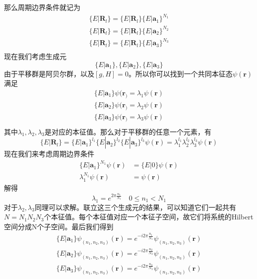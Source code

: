 那么周期边界条件就记为
\begin{equation}
\begin{aligned}
        \{E| \mathbf{R}_l\} = \{E| \mathbf{R}_l\}\{E| \mathbf{a}_1\}^{N_1}\\
        \{E| \mathbf{R}_l\} = \{E| \mathbf{R}_l\}\{E| \mathbf{a}_2\}^{N_2}\\
        \{E| \mathbf{R}_l\} = \{E| \mathbf{R}_l\}\{E| \mathbf{a}_3\}^{N_3}\\
\end{aligned}
\end{equation}
现在我们考虑生成元
\begin{equation}
    \{E|\mathbf{a}_1\},\{E|\mathbf{a}_2\},\{E|\mathbf{a}_3\}
\end{equation}
由于平移群是阿贝尔群，以及$[g,H]=0$。所以你可以找到一个共同本征态$\psi(\mathbf{r})$满足
\begin{equation}
\begin{aligned}
        \{E|\mathbf{a}_1\} \psi(\mathbf{r}_) = \lambda_1 \psi(\mathbf{r}) \\
     \{E|\mathbf{a}_2\} \psi(\mathbf{r}_) = \lambda_2 \psi(\mathbf{r}) \\
      \{E|\mathbf{a}_3\} \psi(\mathbf{r}_) = \lambda_3 \psi(\mathbf{r}) \\
\end{aligned}
\end{equation}
其中$\lambda_1,\lambda_2,\lambda_3$是对应的本征值。那么对于平移群的任意一个元素，有
\begin{equation}
     \{E| \mathbf{R}_l\} = \{E|\mathbf{a}_1\}^{l_1}\{E|\mathbf{a}_2\}^{l_2}\{E|\mathbf{a}_3\}^{l_3} \psi(\mathbf{r}) = \lambda_1^{l_1}\lambda_2^{l_2}\lambda_3^{l_3}\psi(\mathbf{r})
\end{equation}
现在我们来考虑周期边界条件
\begin{equation}
\begin{aligned}
    \{E|\mathbf{a}_1\}^{N_1}\psi(\mathbf{r}) &= \{E|0\}\psi(\mathbf{r})\\
    \lambda_1^{N_1} \psi(\mathbf{r}) &= \psi(\mathbf{r})
\end{aligned}
\end{equation}
解得
\begin{equation}
    \lambda_1 = e^{2\pi \frac{n_1}{N_1}}\quad  0\le n_1 < N_1
\end{equation}
对于$\lambda_2,\lambda_3$同理可以求解。联立这三个生成元的结果，可以知道它们一起共有$N =N_1N_2N_3$个本征值。每个本征值对应一个本征子空间，故它们将系统的Hilbert空间分成N个子空间。最后我们得到
\begin{align}
    \{E|\mathbf{a}_1\}\psi_{(n_1,n_2,n_3)}(\mathbf{r}) = e^{-i2\pi 
    \frac{n_1}{N_1}}\psi_{(n_1,n_2,n_3)}(\mathbf{r}) \\
    \{E|\mathbf{a}_2\}\psi_{(n_1,n_2,n_3)}(\mathbf{r}) = e^{-i2\pi 
    \frac{n_2}{N_2}}\psi_{(n_1,n_2,n_3)}(\mathbf{r}) \\
    \{E|\mathbf{a}_3\}\psi_{(n_1,n_2,n_3)}(\mathbf{r}) = e^{-i2\pi 
    \frac{n_3}{N_3}}\psi_{(n_1,n_2,n_3)}(\mathbf{r}) \\
\end{align}

